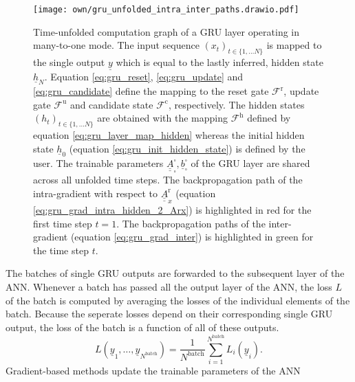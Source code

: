\begin{figure}
    \centering
    \texttt{[image: own/gru\_unfolded\_intra\_inter\_paths.drawio.pdf]}
    \caption[
        Time-unfolded computation graph of a GRU layer operating in many-to-one mode.
    ]{
        Time-unfolded computation graph of a GRU layer operating in many-to-one mode.
        The input sequence $\left(x_t\right)_{t\in\{1,\dots N\}}$ is mapped
        to the single output $\underline y$ which is equal to the lastly inferred, 
        hidden state $\underline h_N$.
        Equation \ref{eq:gru_reset}, \ref{eq:gru_update} and \ref{eq:gru_candidate}
        define the mapping to the 
        reset gate $\mathcal{F}^\text{r}$,
        update gate $\mathcal{F}^\text{u}$
        and candidate state $\mathcal{F}^\text{c}$, respectively.
        The hidden states 
        $\left(h_t\right)_{t\in\{1,\dots N\}}$
        are obtained with
        the mapping 
        $\mathcal{F}^\text{h}$ 
        defined by equation \ref{eq:gru_layer_map_hidden}
        whereas the initial hidden state $\underline h_0$ 
        (equation \ref{eq:gru_init_hidden_state})
        is defined by the user. 
        The trainable parameters 
        $\underline{\underline{A}}^\square_\square, \underline{b}^\square_\square$
        of the GRU layer
        are shared across all unfolded time steps.
        The backpropagation path of the intra-gradient with respect to 
        $\underline{\underline{A}}^\text{r}_x$
        (equation \ref{eq:gru_grad_intra_hidden_2_Arx}) is highlighted in red for the first time step $t=1$.
        The backpropagation paths of the inter-gradient 
        (equation \ref{eq:gru_grad_inter}) 
        is highlighted in green
        for the time step $t$.
        \label{fig:gru_unfolded}}
\end{figure}
The batches of single GRU outputs are forwarded to the subsequent layer of the ANN.
Whenever a batch has passed all the output layer of the ANN,
the loss $L$ of the batch is computed by averaging the losses of
the individual elements of the batch.
Because the seperate losses depend on their corresponding single GRU output,
the loss of the batch is a function of all of these outputs.
\begin{equation} \label{eq:loss_of_batch}
    L\left(\underline y_1, \dots, \underline y_{N^\text{batch}}\right) 
    = 
    \frac{1}{N^\text{batch}}
    \sum_{i=1}^{N^\text{batch}} L_i \left(\underline y_i\right).
\end{equation}
Gradient-based methods update the trainable parameters of the ANN
